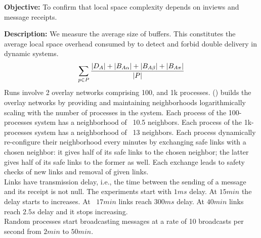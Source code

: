 \noindent \textbf{Objective:} To confirm that local space complexity
depends on inviews and message receipts.

\noindent \textbf{Description:} We measure the average size of
buffers. This constitutes the average local space overhead consumed by
\RPCBROADCAST to detect and forbid double delivery in dynamic systems.
\begin{equation*}\centering\sum\limits_{p \in P} {|D_A| + |B_{A\alpha}| + |B_{A\beta}|
    + |B_{A\pi}|\over{ |P|}}
\end{equation*}
Runs involve 2 overlay networks comprising 100, and 1k
processes. \SPRAY (\REF) builds the overlay networks by providing and
maintaining neighborhoods logarithmically scaling with the number of
processes in the system. Each process of the 100-processes system has
a neighborhood of ~10.5 neighbors. Each process of the 1k-processes
system has a neighborhood of ~13 neighbors. Each process dynamically
re-configure their neighborhood every minutes by exchanging safe links
with a chosen neighbor: it gives half of its safe links to the chosen
neighbor; the latter gives half of its safe links to the former as
well. Each exchange leads to safety checks of new links and removal of
given links. \\ Links have transmission delay, i.e.,
the time between the sending of a message and its receipt is not
null. The experiments start with $1ms$ delay. At $15min$ the delay
starts to increases. At ~$17min$ links reach $300ms$ delay. At $40min$
links reach $2.5s$ delay and it stops increasing.\\ Random processes
start broadcasting messages at a rate of 10 broadcasts per second from
$2min$ to $50min$.

